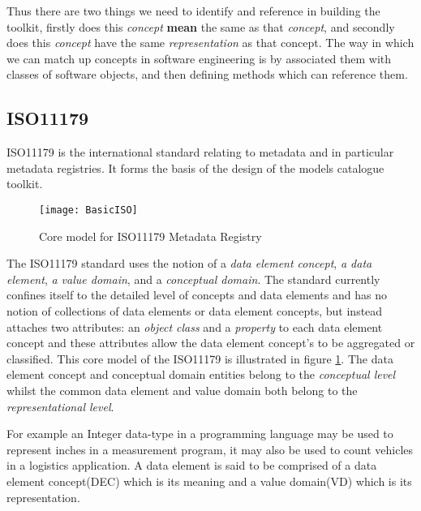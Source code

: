 Thus there are two things we need to identify and reference in building the toolkit, firstly does this \emph{concept} \textbf{mean} the same as that \emph{concept}, and secondly does this \emph{concept} have the same \emph{representation} as that concept. The way in which we can match up concepts in software engineering is by associated them with classes of software objects, and then defining methods which can reference them. 

\subsection{ISO11179}
ISO11179 is the international standard relating to metadata and in particular metadata registries. It forms the basis of the design of the models catalogue toolkit.

\begin{figure}[here]
	\texttt{[image: BasicISO]}
	\caption{Core model for ISO11179 Metadata Registry} 
	\label{fig:basicMDR}
\end{figure}

The ISO11179 standard uses the notion of a \emph{data element concept}, \emph{a data element}, \emph{a value domain}, and a \emph{conceptual domain}. The standard currently confines itself to the detailed level of concepts and data elements and has no notion of collections of data elements or data element concepts, but instead attaches two attributes: an \emph{object class} and a \emph{property} to each data element concept and these attributes allow the data element concept's to be aggregated or classified. This core model of the ISO11179 is illustrated in figure \ref{fig:basicMDR}. The data element concept and conceptual domain entities belong to the \emph{conceptual level}  whilst the common data element and value domain both belong to the \emph{representational level}.


For example an Integer data-type in a programming language may be used to represent inches in a measurement program, it may also be used to count vehicles in a logistics application.  A data element is said to be comprised of a data element concept(DEC) which is its meaning and a value domain(VD) which is its representation.

